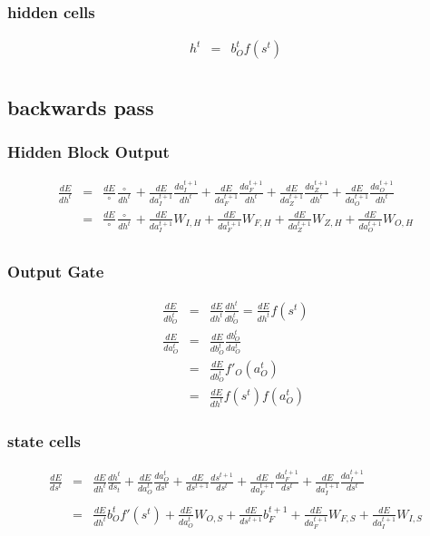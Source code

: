 \documentclass{article}
\begin{document}
\subsubsection{hidden cells}
\begin{eqnarray*}
h^t &=& b_{O}^t f(s^t) \\
\end{eqnarray*}


\subsection{backwards pass}

\subsubsection{Hidden Block Output}
\begin{eqnarray*}
\frac{dE}{dh^t} &=& \frac{dE}{ \circ }\frac{ \circ }{dh^t} + \frac{dE}{da_{I}^{t+1}}\frac{da_{I}^{t+1}}{dh^t} + \frac{dE}{da_{F}^{t+1}}\frac{da_{F}^{t+1}}{dh^{t}} + \frac{dE}{da_{Z}^{t+1}}\frac{da_{Z}^{t+1}}{dh^t} + \frac{dE}{da_{O}^{t+1}}\frac{da_{O}^{t+1}}{dh^t} \\
 &=& \frac{dE}{\circ}\frac{\circ}{dh^t} + \frac{dE}{da_{I}^{t+1}}W_{I,H} + \frac{dE}{da_{F}^{t+1}}W_{F,H} + \frac{dE}{da_{Z}^{t+1}}W_{Z,H} + \frac{dE}{da_{O}^{t+1}}W_{O,H} \\
\end{eqnarray*}

\subsubsection{Output Gate}
\begin{eqnarray*}
\frac{dE}{db_{O}^t} &=& \frac{dE}{dh^t}\frac{dh^t}{db_{O}^t} = \frac{dE}{dh^t}f(s^t) \\ 
\frac{dE}{da_{O}^t} &=& \frac{dE}{db_{O}^t}\frac{db_{O}^t}{da_{O}^t} \\
&=& \frac{dE}{db_{O}^t}f'_{O}(a_{O}^t) \\
&=& \frac{dE}{dh^t}f(s^t)f(a_{O}^t) 
\end{eqnarray*}

\subsubsection{state cells}
\begin{eqnarray*}
\frac{dE}{ds^t}&=&\frac{dE}{dh^t}\frac{dh^t}{ds_t} + \frac{dE}{da_{O}^t}\frac{da_{O}^t}{ds^t}+\frac{dE}{ds^{t+1}}\frac{ds^{t+1}}{ds^t}+\frac{dE}{da_{F}^{t+1}}\frac{da_{F}^{t+1}}{ds^t} + \frac{dE}{da_{I}^{t+1}}\frac{da_{I}^{t+1}}{ds^t}\\ \\
&=& \frac{dE}{dh^t}b_{O}^tf'(s^t)+ \frac{dE}{da_{O}^t}W_{O,S} + \frac{dE}{ds^{t+1}}b_{F}^{t+1} + \frac{dE}{da_{F}^{t+1}}W_{F,S} + \frac{dE}{da_{I}^{t+1}}W_{I,S} \\
\end{eqnarray*}
\end{document}
